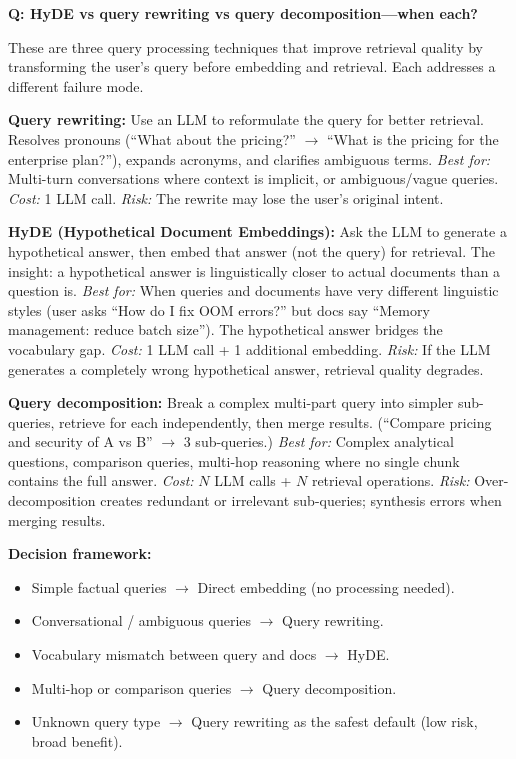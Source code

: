 \begin{interviewq}
\textbf{Q: HyDE vs query rewriting vs query decomposition---when each?}

 \quad {} \quad \badgefreq{\freqmed}

\stronganswer

These are three query processing techniques that improve retrieval quality by transforming the user's query before embedding and retrieval. Each addresses a different failure mode.

\textbf{Query rewriting:} Use an LLM to reformulate the query for better retrieval. Resolves pronouns (``What about the pricing?'' $\rightarrow$ ``What is the pricing for the enterprise plan?''), expands acronyms, and clarifies ambiguous terms. \textit{Best for:} Multi-turn conversations where context is implicit, or ambiguous/vague queries. \textit{Cost:} 1 LLM call. \textit{Risk:} The rewrite may lose the user's original intent.

\textbf{HyDE (Hypothetical Document Embeddings):} Ask the LLM to generate a hypothetical answer, then embed that answer (not the query) for retrieval. The insight: a hypothetical answer is linguistically closer to actual documents than a question is. \textit{Best for:} When queries and documents have very different linguistic styles (user asks ``How do I fix OOM errors?'' but docs say ``Memory management: reduce batch size''). The hypothetical answer bridges the vocabulary gap. \textit{Cost:} 1 LLM call + 1 additional embedding. \textit{Risk:} If the LLM generates a completely wrong hypothetical answer, retrieval quality degrades.

\textbf{Query decomposition:} Break a complex multi-part query into simpler sub-queries, retrieve for each independently, then merge results. (``Compare pricing and security of A vs B'' $\rightarrow$ 3 sub-queries.) \textit{Best for:} Complex analytical questions, comparison queries, multi-hop reasoning where no single chunk contains the full answer. \textit{Cost:} $N$ LLM calls + $N$ retrieval operations. \textit{Risk:} Over-decomposition creates redundant or irrelevant sub-queries; synthesis errors when merging results.

\textbf{Decision framework:}
\begin{itemize}
    \item Simple factual queries $\rightarrow$ Direct embedding (no processing needed).
    \item Conversational / ambiguous queries $\rightarrow$ Query rewriting.
    \item Vocabulary mismatch between query and docs $\rightarrow$ HyDE.
    \item Multi-hop or comparison queries $\rightarrow$ Query decomposition.
    \item Unknown query type $\rightarrow$ Query rewriting as the safest default (low risk, broad benefit).
\end{itemize}


\end{interviewq}
